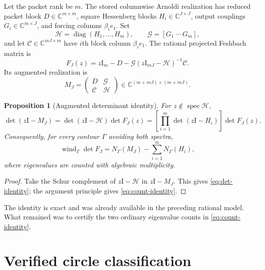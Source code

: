 \documentclass[11pt]{article}
\newtheorem{proposition}[theorem]{Proposition}
\theoremstyle{definition}
\theoremstyle{remark}
\newcommand{\C}{\mathbb C}
\newcommand{\Id}{\mathrm I}
\newcommand{\spec}{\operatorname{spec}}
\newcommand{\wind}{\operatorname{wind}}
\begin{document}
Let the packet rank be $m$.  The stored columnwise Arnoldi realization has
reduced packet block $D\in\C^{m\times m}$, square Hessenberg blocks
$H_i\in\C^{J\times J}$, output couplings
$G_i\in\C^{m\times J}$, and forcing columns $\beta_i e_1$.  Set
\begin{equation}
 \mathcal H=\operatorname{diag}(H_1,\ldots,H_m),
 \qquad
 \mathcal G=[G_1\ \cdots\ G_m],
 \label{eq:block-h}
\end{equation}
and let $\mathcal C\in\C^{mJ\times m}$ have $i$th block column
$\beta_i e_1$.  The rational projected Feshbach matrix is
\begin{equation}
 F_J(z)=z\Id_m-D-\mathcal G(z\Id_{mJ}-\mathcal H)^{-1}\mathcal C.
 \label{eq:projected-feshbach}
\end{equation}
Its augmented realization is
\begin{equation}
 M_J=
 \begin{pmatrix}
  D&\mathcal G\\
  \mathcal C&\mathcal H
 \end{pmatrix}
 \in\C^{(m+mJ)\times(m+mJ)}.
 \label{eq:augmented}
\end{equation}

\begin{proposition}[Augmented determinant identity]
\label{prop:det-identity}
For $z\notin\spec\mathcal H$,
\begin{equation}
 \det(z\Id-M_J)
 =\det(z\Id-\mathcal H)\det F_J(z)
 =\left[\prod_{i=1}^m\det(z\Id-H_i)\right]\det F_J(z).
 \label{eq:det-identity}
\end{equation}
Consequently, for every contour $\Gamma$ avoiding both spectra,
\begin{equation}
 \wind_\Gamma\det F_J
 =N_\Gamma(M_J)-\sum_{i=1}^m N_\Gamma(H_i),
 \label{eq:count-identity}
\end{equation}
where eigenvalues are counted with algebraic multiplicity.
\end{proposition}

\begin{proof}
Take the Schur complement of $z\Id-\mathcal H$ in $z\Id-M_J$.  This gives
\cref{eq:det-identity}; the argument principle gives
\cref{eq:count-identity}.
\end{proof}

The identity is exact and was already available in the preceding rational
model.  What remained was to certify the two ordinary eigenvalue counts in
\cref{eq:count-identity}.


\section{Verified circle classification}
\label{sec:verified-count}
\end{document}

